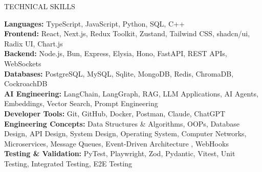\documentclass{resume} %
\begin{document}
\begin{rSection}{TECHNICAL SKILLS}

\setlength{\parskip}{6pt}
\setlength{\parindent}{2pt}

\textbf{Languages:} TypeScript, JavaScript, Python, SQL, C++ \\[2pt]
\textbf{Frontend:} React, Next.js, Redux Toolkit, Zustand, Tailwind CSS, shadcn/ui, Radix UI, Chart.js \\[2pt]
\textbf{Backend:} Node.js, Bun, Express, Elysia, Hono, FastAPI, REST APIs, WebSockets \\[2pt]
\textbf{Databases:} PostgreSQL, MySQL, Sqlite, MongoDB, Redis, ChromaDB, CockroachDB \\[2pt]
\textbf{AI Engineering:} LangChain, LangGraph, RAG, LLM Applications, AI Agents, Embeddings, Vector Search, Prompt Engineering \\[2pt]
\textbf{Developer Tools:} Git, GitHub, Docker, Postman, Claude, ChatGPT \\[2pt]
\textbf{Engineering Concepts:} Data Structures \& Algorithms, OOPs, Database Design, API Design, System Design, Operating System, Computer Networks, Microservices, Message Queues, Event-Driven Architecture , WebHooks \\[2pt]
\textbf{Testing \& Validation:} PyTest, Playwright, Zod, Pydantic, Vitest, Unit Testing, Integrated Testing, E2E Testing

\end{rSection}

\vspace{-2pt}

\end{document}
